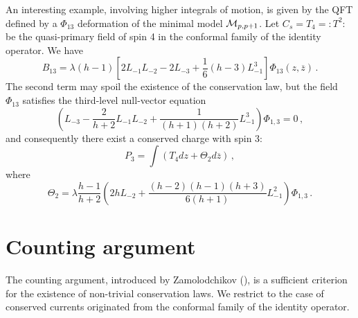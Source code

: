 \documentclass[a4paper,12pt]{report}
\begin{document}
\vspace{0.5cm}

An interesting example, involving higher integrals of motion, is given by the QFT defined by a $\Phi_{13}$
deformation of the minimal model ${\cal M}_{p,p+1}$. Let $C_{s}=T_{4}=:T^{2}:$ be the quasi-primary field of spin
4 in the conformal family of the identity operator. We have
\begin{equation}
B_{13}=\lambda(h-1)\left[2L_{-1}L_{-2}-2L_{-3}+\frac{1}{6}(h-3)L_{-1}^{3}\right]\Phi_{13}\left(z,\overline{z}\right)\,.
\end{equation}
The second term may spoil the existence of the conservation law, but the field $\Phi_{13}$ satisfies the
third-level null-vector equation
\begin{equation}\label{3levnull}
\left(L_{-3}-\frac{2}{h+2}L_{-1}L_{-2}+\frac{1}{(h+1)(h+2)}L_{-1}^{3}\right)\Phi_{1,3}=0 \,,
\end{equation}
and consequently there exist a conserved charge with spin 3:
\begin{equation}
P_{3}=\int\left(T_{4} dz+\Theta_{2} d \overline{z}\right) \,,
\end{equation}
where
\begin{equation}
\Theta_{2}=\lambda\frac{h-1}{h+2}\left(2h
L_{-2}+\frac{\left(h-2\right)\left(h-1\right)\left(h+3\right)}{6\left(h+1\right)}L_{-1}^{2}\right)\Phi_{1,3} \, .
\end{equation}

\vspace{1cm}

\section{Counting argument}

The counting argument, introduced by Zamolodchikov (\cite{sbrind}), is a sufficient criterion for the existence of
non-trivial conservation laws. We restrict to the case of conserved currents originated from the conformal family
of the identity operator.
\end{document}
